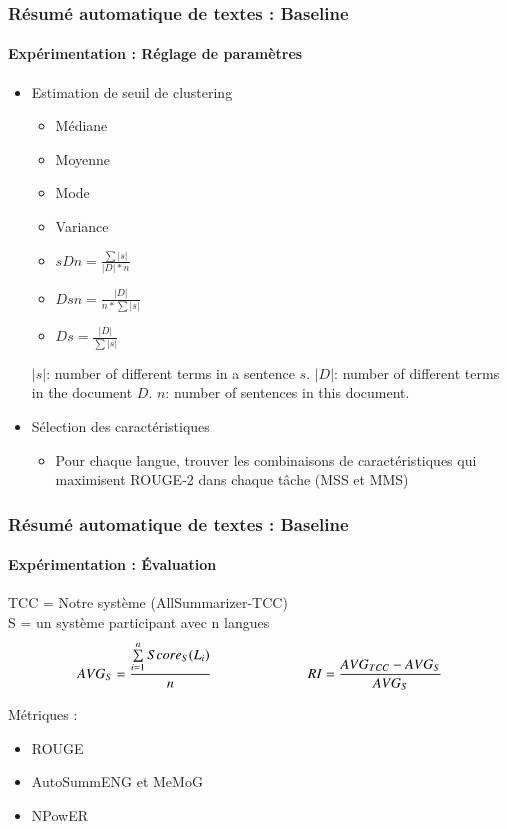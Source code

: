 \documentclass[xcolor=table]{beamer}
\begin{document}
\begin{frame}
\frametitle{Résumé automatique de textes : Baseline}
\framesubtitle{Expérimentation : Réglage de paramètres}
	
\begin{itemize}
	
	\item Estimation de seuil de clustering 
	\vspace{-.5cm}
	\begin{multicols}{3}
	\begin{itemize}
		\item Médiane
		\item Moyenne
		\item Mode 
		\item Variance
		\item $ sDn = \frac{\sum |s|}{|D| * n}$ 
		\item $ Dsn = \frac{|D|}{n * \sum |s|}$ 
		\item $ Ds = \frac{|D|}{\sum |s|}$ 
	\end{itemize}
	\end{multicols}
	\vspace{-.4cm}
	$|s|$: number of different terms in a sentence $s$. 
	$|D|$: number of different terms in the document $D$.
	$n$: number of sentences in this document. 
	
	\item Sélection des caractéristiques 
	\begin{itemize}
		\item Pour chaque langue, trouver les combinaisons de caractéristiques qui maximisent ROUGE-2 dans chaque tâche (MSS et MMS)
	\end{itemize}
\end{itemize}
	
\end{frame}

\begin{frame}
\frametitle{Résumé automatique de textes : Baseline}
\framesubtitle{Expérimentation : Évaluation}
	
TCC = Notre système (AllSummarizer-TCC)\\
S = un système participant avec n langues\\

\[ 
AVG_{S} = \frac{\sum\limits_{i=1}^{n} Score_S(L_i)}{n}
\hskip0.2\textwidth 
RI = \frac{AVG_{TCC} - AVG_{S}}{AVG_{S}}
\]

Métriques : 
\begin{itemize}
	\item ROUGE \cite{04-lin}
	\item AutoSummENG et MeMoG \cite{11-giannakopoulos-al}
	\item NPowER \cite{13-giannakopoulos-karkaletsis}
\end{itemize}
	
\end{frame}
\end{document}
